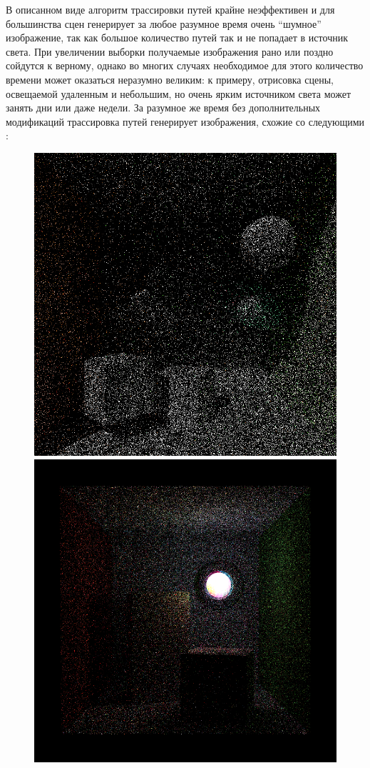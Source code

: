 \documentclass[12pt]{article}
\begin{document}
В описанном виде алгоритм трассировки путей крайне неэффективен и для большинства сцен генерирует за любое разумное время очень ``шумное'' изображение, так как большое количество путей так и не попадает в источник света. При увеличении выборки получаемые изображения рано или поздно сойдутся к верному, однако во многих случаях необходимое для этого количество времени может оказаться неразумно великим: к примеру, отрисовка сцены, освещаемой удаленным и небольшим, но очень ярким источником света может занять дни или даже недели. За разумное же время без дополнительных модификаций трассировка путей генерирует изображения, схожие со следующими \cite{karlIMP, karlBDPT}:
\begin{figure}[h]
\centering
\includegraphics[scale=0.3]{indirect5120.png}
\includegraphics[scale=0.3]{spherelight_16.png}

\end{figure}
\end{document}
